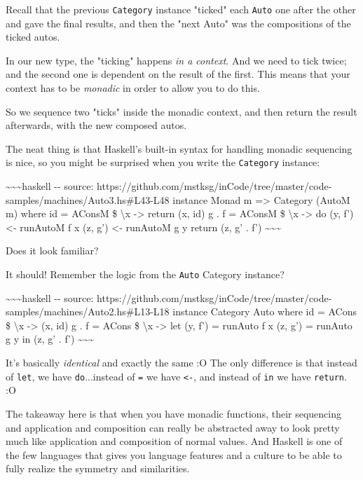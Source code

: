 \documentclass[]{article}
\begin{document}
Recall that the previous \texttt{Category} instance "ticked" each \texttt{Auto}
one after the other and gave the final results, and then the "next Auto" was the
compositions of the ticked autos.

In our new type, the "ticking" happens \emph{in a context}. And we need to tick
twice; and the second one is dependent on the result of the first. This means
that your context has to be \emph{monadic} in order to allow you to do this.

So we sequence two "ticks" inside the monadic context, and then return the
result afterwards, with the new composed autos.

The neat thing is that Haskell's built-in syntax for handling monadic sequencing
is nice, so you might be surprised when you write the \texttt{Category}
instance:

\textasciitilde{}\textasciitilde{}\textasciitilde{}haskell -\/- source:
https://github.com/mstksg/inCode/tree/master/code-samples/machines/Auto3.hs\#L43-L48
instance Monad m =\textgreater{} Category (AutoM m) where id = AConsM \$
\textbackslash{}x -\textgreater{} return (x, id) g . f = AConsM \$
\textbackslash{}x -\textgreater{} do (y, f') \textless{}- runAutoM f x (z, g')
\textless{}- runAutoM g y return (z, g' . f')
\textasciitilde{}\textasciitilde{}\textasciitilde{}

Does it look familiar?

It should! Remember the logic from the \texttt{Auto} Category instance?

\textasciitilde{}\textasciitilde{}\textasciitilde{}haskell -\/- source:
https://github.com/mstksg/inCode/tree/master/code-samples/machines/Auto2.hs\#L13-L18
instance Category Auto where id = ACons \$ \textbackslash{}x -\textgreater{} (x,
id) g . f = ACons \$ \textbackslash{}x -\textgreater{} let (y, f') = runAuto f x
(z, g') = runAuto g y in (z, g' . f')
\textasciitilde{}\textasciitilde{}\textasciitilde{}

It's basically \emph{identical} and exactly the same :O The only difference is
that instead of \texttt{let}, we have \texttt{do}...instead of \texttt{=} we
have \texttt{\textless{}-}, and instead of \texttt{in} we have \texttt{return}.
:O

The takeaway here is that when you have monadic functions, their sequencing and
application and composition can really be abstracted away to look pretty much
like application and composition of normal values. And Haskell is one of the few
languages that gives you language features and a culture to be able to fully
realize the symmetry and similarities.
\end{document}
